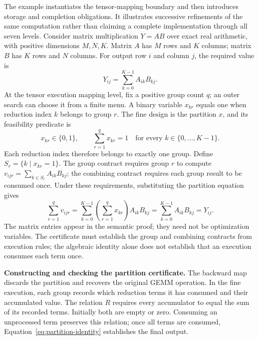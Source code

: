 \documentclass[11pt]{article}
\begin{document}
The example instantiates the tensor-mapping boundary and then introduces storage and completion obligations. It illustrates successive refinements of the same computation rather than claiming a complete implementation through all seven levels. Consider matrix multiplication $Y=AB$ over exact real arithmetic, with positive dimensions $M,N,K$. Matrix $A$ has $M$ rows and $K$ columns; matrix $B$ has $K$ rows and $N$ columns. For output row $i$ and column $j$, the required value is
\begin{equation}
 Y_{ij}=\sum_{k=0}^{K-1} A_{ik}B_{kj}.
\end{equation}
At the tensor execution mapping level, fix a positive group count $q$; an outer search can choose it from a finite menu. A binary variable $x_{kr}$ equals one when reduction index $k$ belongs to group $r$. The fine design is the partition $x$, and its feasibility predicate is
\begin{equation}
 x_{kr}\in\{0,1\},\qquad \sum_{r=1}^{q}x_{kr}=1
 \quad\text{for every }k\in\{0,\ldots,K-1\}.
 \label{eq:partition}
\end{equation}
Each reduction index therefore belongs to exactly one group. Define $S_r=\{k\mid x_{kr}=1\}$. The group contract requires group $r$ to compute $v_{ijr}=\sum_{k\in S_r}A_{ik}B_{kj}$; the combining contract requires each group result to be consumed once. Under these requirements, substituting the partition equation gives
\begin{equation}
 \sum_{r=1}^{q}v_{ijr}
 =\sum_{k=0}^{K-1}\left(\sum_{r=1}^{q}x_{kr}\right)A_{ik}B_{kj}
 =\sum_{k=0}^{K-1}A_{ik}B_{kj}=Y_{ij}.
 \label{eq:partition-identity}
\end{equation}
The matrix entries appear in the semantic proof; they need not be optimization variables. The certificate must establish the group and combining contracts from execution rules; the algebraic identity alone does not establish that an execution consumes each term once.

\textbf{Constructing and checking the partition certificate.}
The backward map discards the partition and recovers the original GEMM operation. In the fine execution, each group records which reduction terms it has consumed and their accumulated value. The relation $R$ requires every accumulator to equal the sum of its recorded terms. Initially both are empty or zero. Consuming an unprocessed term preserves this relation; once all terms are consumed, Equation~\ref{eq:partition-identity} establishes the final output.
\end{document}
